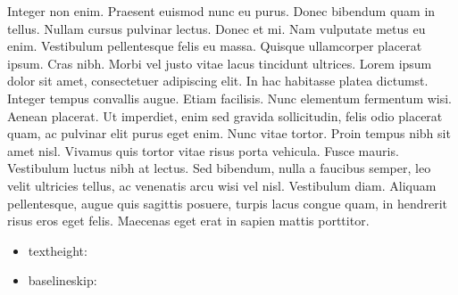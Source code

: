 \documentclass[draft,12pt,twoside,a4paper]{book}
\begin{document}
Integer non enim.
Praesent euismod nunc eu purus.
Donec bibendum quam in tellus.
Nullam cursus pulvinar lectus.
Donec et mi.
Nam vulputate metus eu enim.
Vestibulum pellentesque felis eu massa.
Quisque ullamcorper placerat ipsum.
Cras nibh.
Morbi vel justo vitae lacus tincidunt ultrices.
Lorem ipsum dolor sit amet, consectetuer adipiscing elit.
In hac habitasse platea dictumst.
Integer tempus convallis augue.
Etiam facilisis.
Nunc elementum fermentum wisi.
Aenean placerat.
Ut imperdiet, enim sed gravida sollicitudin, felis odio placerat quam,
 ac pulvinar elit purus eget enim.
Nunc vitae tortor.
Proin tempus nibh sit amet nisl.
Vivamus quis tortor vitae risus porta vehicula.
Fusce mauris.
Vestibulum luctus nibh at lectus.
Sed bibendum, nulla a faucibus semper, leo velit ultricies tellus,
 ac venenatis arcu wisi vel nisl.
Vestibulum diam.
Aliquam pellentesque, augue quis sagittis posuere, turpis lacus congue quam,
 in hendrerit risus eros eget felis.
Maecenas eget erat in sapien mattis porttitor.

\begin{itemize}
\item textheight: \the\textheight
\item baselineskip: \the\baselineskip
\end{itemize}
\end{document}
